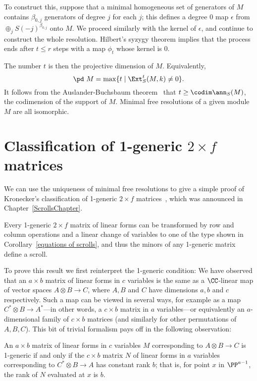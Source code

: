 To construct this, suppose that a minimal homogeneous set of generators of $M$
contains $\beta_{0,j}$ generators of degree $j$ for each $j$; this defines a degree 0 map $\epsilon$
from 
$
\oplus_jS(-j)^{\beta_{0,j}}
$
onto $M$. We proceed similarly with the kernel of $\epsilon$, and continue to construct the whole resolution.
Hilbert's syzygy theorem \cite[Corollary 19.7]{Eisenbud1995} implies that the process ends after $t\leq r$ steps with a map $\phi_t$ whose
kernel is 0. 

The number $t$ is then the projective dimension of $M$. 
Equivalently, 
$$
\pd\ M = \max\{t \mid \Ext_S^t(M,k) \neq 0 \}.
$$
It follows from the Auslander-Buchsbaum
theorem~\cite[Theorem 19.9]{Eisenbud1995} that $t \geq \codim \ann_S(M)$, the codimension of the support of $M$.
Minimal free resolutions of a given module $M$ are all isomorphic.

\section{Classification of 1-generic \texorpdfstring{$2\times f$}{2 x f} matrices}\label{Kronecker}

We can use the uniqueness of minimal free resolutions to give a simple proof of Kronecker's classification of 1-generic $2\times f$
 matrices~\cite{Gantmacher}, which was announced in Chapter~\ref{ScrollsChapter}.
 
\begin{theorem}\label{matrix pencils}
 Every
 1-generic $2 \times f$ matrix of linear forms can be transformed by row and column operations and a linear change
 of variables to one of the type shown in
Corollary~\ref{equations of scrolls}, and thus the minors of any 1-generic matrix define a scroll. 
\end{theorem}


To prove this result we first reinterpret the 1-generic condition:
We have observed that an
$a\times b$ matrix of linear forms in $c$ variables is the same as a $\CC$-linear map of vector spaces
$A \otimes B \to C$, where $A, B$ and $C$ have dimensions $a,b$ and $c$ respectively. Such a map
can be viewed in several ways, for example as a map $C^{*} \otimes B\to A^{*}$---in other words, a $c\times b$ matrix in $a$ variables---or equivalently an $a$-dimensional family of $c\times b$ matrices (and similarly for other permutations of $A,B,C$). 
This bit of trivial formalism pays off in the following observation:

\begin{proposition}\label{reinterpretation of 1-generic}
An  $a\times b$ matrix of linear forms in $c$ variables $M$ corresponding to $A\otimes B \to C$ is 1-generic if and only if the $c \times b$ matrix $N$ of linear forms in $a$ variables corresponding to $C^{*}\otimes B \to A$ has constant rank $b$; that is, 
for point $x$ in $\PP^{a-1}$, the rank of $N$ evaluated at $x$ is $b$.
\end{proposition}

